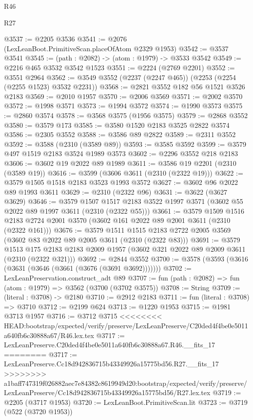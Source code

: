 \begin{lexlean}{R46}
\begin{lexlean}{R27}
\begin{coremodule}
{{{{{{{{{{{{{{{{{{{{{{{{{{{{{{{{{{{{{{{{{{{{{{{{{{{{{{{{{{{{{{@3537 := @2205 @3536
@3541 := @2076 (LexLeanBoot.PrimitiveScan.placeOfAtom @2329 @1953)
@3542 := @3537 @3541
@3545 := (path : @2082) -> (atom : @1979) -> @3533 @3542
@3549 := @2216 @465 @3532 @3542 @1523
@3551 := @2224 (@2769 @2201)
@3552 := @3551 @2964
@3562 := @3549 @3552 (@2237 (@2247 @465)) (@2253 (@2254 (@2255 @1523) @3532 @2231))
@3568 := @2821 @3552 @182 @56 @1521 @3526 @2183
@3569 := @2010 @1957
@3570 := @2006 @3569
@3571 := @2002 @3570
@3572 := @1998 @3571
@3573 := @1994 @3572
@3574 := @1990 @3573
@3575 := @2860 @3574
@3578 := @3568 @3575 (@1956 @3575)
@3579 := @2868 @3552
@3580 := @3579 @173
@3585 := @3580 @1520 @2183 @3525 @2822 @3574
@3586 := @2305 @3552
@3588 := @3586 @89 @2822
@3589 := @2311 @3552
@3592 := @3588 (@2310 (@3589 @89))
@3593 := @3585 @3592
@3599 := @3579 @497 @1519 @2183 @3524 @1989 @3573
@3602 := @2296 @3552 @218 @2183
@3606 := @3602 @19 @2022 @89 @1989
@3611 := @3586 @19 @2201 (@2310 (@3589 @19))
@3616 := @3599 (@3606 @3611 (@2310 (@2322 @19)))
@3622 := @3579 @1505 @1518 @2183 @3523 @1993 @3572
@3627 := @3602 @96 @2022 @89 @1993 @3611
@3629 := @2310 (@2322 @96)
@3631 := @3622 (@3627 @3629)
@3646 := @3579
    @1507
    @1517
    @2183
    @3522
    @1997
    @3571
    (@3602 @55 @2022 @89 @1997 @3611 (@2310 (@2322 @55)))
@3661 := @3579
    @1509
    @1516
    @2183
    @2724
    @2001
    @3570
    (@3602 @161 @2022 @89 @2001 @3611 (@2310 (@2322 @161)))
@3676 := @3579
    @1511
    @1515
    @2183
    @2722
    @2005
    @3569
    (@3602 @83 @2022 @89 @2005 @3611 (@2310 (@2322 @83)))
@3691 := @3579
    @1513
    @175
    @2183
    @2183
    @2009
    @1957
    (@3602 @321 @2022 @89 @2009 @3611 (@2310 (@2322 @321)))
@3692 := @2844 @3552
@3700 := @3578 (@3593 (@3616 (@3631 (@3646 (@3661 (@3676 (@3691 @3692)))))))
@3702 := LexLeanPreservation.construct_adt @89
@3707 := fun (path : @2082) => fun (atom : @1979) => @3562 (@3700 (@3702 @3575))
@3708 := String
@3709 := (literal : @3708) -> @2180
@3710 := @2912 @2183
@3711 := fun (literal : @3708) => @3710
@3712 := @2199 @624
@3713 := @1220 @1953
@3715 := @1981 @3713 @1957
@3716 := @3712 @3715
<<<<<<<< HEAD:bootstrap/expected/verify/preserve/LexLeanPreserve/C20ded4f4be0e5011a640fb6c30888a67/R46.lex.tex
@3717 := LexLeanPreserve.C20ded4f4be0e5011a640fb6c30888a67.R46.__fits_17
========
@3717 := LexLeanPreserve.Cc18d942836715b43349926a15775bd56.R27.__fits_17
>>>>>>>> a1baff747319f026882aec7e84382c8619949d20:bootstrap/expected/verify/preserve/LexLeanPreserve/Cc18d942836715b43349926a15775bd56/R27.lex.tex
@3719 := @2205 (@3717 @1953)
@3720 := LexLeanBoot.PrimitiveScan.lit
@3723 := @3719 (@522 (@3720 @1953))
}}}}}}}}}}}}}}}}}}}}}}}}}}}}}}}}}}}}}}}}}}}}}}}}}}}}}}}}}}}}}}
\end{coremodule}
\end{lexlean}
\end{lexlean}
